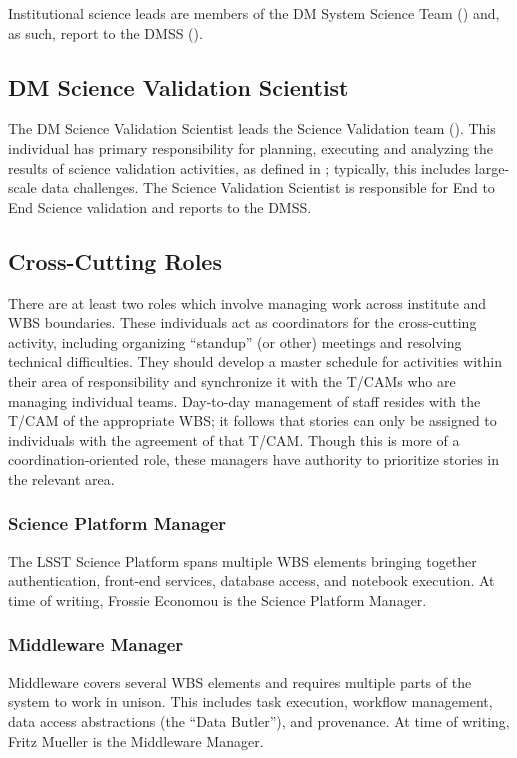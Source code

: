 Institutional science leads are members of the \gls{DM} System Science Team () and, as such, report to the \gls{DMSS} ().

\subsection{DM Science \gls{Validation} Scientist}
\label{role:dmsvs}

The \gls{DM} Science \gls{Validation} Scientist leads the Science \gls{Validation} team ().
This individual has primary responsibility for planning, executing and analyzing the results of science validation activities, as defined in ; typically, this includes large-scale data challenges.
The Science \gls{Validation} Scientist is responsible for End to End Science validation and reports to the \gls{DMSS}.

\subsection{Cross-Cutting Roles}\label{role:crosscut}

There are at least two roles which involve managing work across institute and \gls{WBS} boundaries.
These individuals act as coordinators for the cross-cutting activity, including organizing ``standup'' (or other) meetings and resolving technical difficulties.
They should develop a master schedule for activities within their area of responsibility and synchronize it with the T/CAMs who are managing individual teams.
Day-to-day management of staff resides with the \gls{T/CAM} of the appropriate \gls{WBS}; it follows that stories can only be assigned to individuals with the agreement of that \gls{T/CAM}.
Though this is more of a coordination-oriented role, these managers have authority to prioritize stories in the relevant area.

\subsubsection{Science Platform Manager}\label{role:lsplead}

The \gls{LSST} \gls{Science Platform} spans multiple \gls{WBS} elements bringing together authentication, front-end services, database access, and notebook execution.
At time of writing, Frossie Economou is the \gls{Science Platform} Manager.

\subsubsection{Middleware Manager}\label{role:mwlead}

Middleware covers several \gls{WBS} elements and requires multiple parts of the system to work in unison.
This includes task execution, workflow management, data access abstractions (the ``Data \gls{Butler}''), and \gls{provenance}.
At time of writing, Fritz Mueller is the Middleware Manager.
